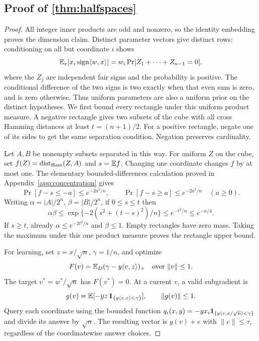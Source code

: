 \subsection[Proof of result halfspaces]{Proof of \cref{thm:halfspaces}}\label{proof:halfspaces}
\begin{proof}
All integer inner products are odd and nonzero, so the identity embedding proves the dimension claim. Distinct parameter vectors give distinct rows: conditioning on all but coordinate $i$ shows
\[
 \mathbb E_x[x_i\operatorname{sign}\langle w,x\rangle]
 =w_i\Pr[Z_1+\cdots+Z_{n-1}=0],
\]
where the $Z_j$ are independent fair signs and the probability is positive. The conditional difference of the two signs is two exactly when that even sum is zero, and is zero otherwise. Thus uniform parameters are also a uniform prior on the distinct hypotheses. We first bound every rectangle under this uniform product measure. A negative rectangle gives two subsets of the cube with all cross Hamming distances at least $t=(n+1)/2$. For a positive rectangle, negate one of its sides to get the same separation condition. Negation preserves cardinality.

Let $A,B$ be nonempty subsets separated in this way. For uniform $Z$ on the cube, set $f(Z)=\operatorname{dist}_{\rm Ham}(Z,A)$ and $s=\mathbb E f$. Changing one coordinate changes $f$ by at most one. The elementary bounded-differences calculation proved in Appendix~\ref{app:concentration} gives
\[
 \Pr[f-s\le-a]\le e^{-2a^2/n},\qquad
 \Pr[f-s\ge a]\le e^{-2a^2/n}\quad(a\ge0).
\]
Writing $\alpha=|A|/2^n$, $\beta=|B|/2^n$, if $0\le s\le t$ then
\[
 \alpha\beta\le\exp\{-2(s^2+(t-s)^2)/n\}
 \le e^{-t^2/n}\le e^{-n/4}.
\]
If $s\ge t$, already $\alpha\le e^{-2t^2/n}$ and $\beta\le1$. Empty rectangles have zero mass. Taking the maximum under this one product measure proves the rectangle upper bound.

For learning, set $z=x/\sqrt n$, $\gamma=1/n$, and optimize
\[
 F(v)=\mathbb E_D(\gamma-y\langle v,z\rangle)_+
 \quad\text{over }\|v\|\le1.
\]
The target $v^*=w^*/\sqrt n$ has $F(v^*)=0$. At a current $v$, a valid subgradient is
\[
 g(v)=\mathbb E[-yz\,\mathbf 1_{\{y\langle v,z\rangle<\gamma\}}],\qquad\|g(v)\|\le1.
\]
Query each coordinate using the bounded function
$q_i(x,y)=-yx_i\mathbf 1_{\{y\langle v,x/\sqrt n\rangle<\gamma\}}$ and divide its answer by $\sqrt n$. The resulting vector is $g(v)+e$ with $\|e\|\le\tau$, regardless of the coordinatewise answer choices.


\end{proof}
